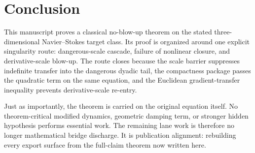 \section{Conclusion}

This manuscript proves a classical no-blow-up theorem on the stated three-dimensional Navier--Stokes target class. Its proof is organized around one explicit singularity route: dangerous-scale cascade, failure of nonlinear closure, and derivative-scale blow-up. The route closes because the scale barrier suppresses indefinite transfer into the dangerous dyadic tail, the compactness package passes the quadratic term on the same equation, and the Euclidean gradient-transfer inequality prevents derivative-scale re-entry.

Just as importantly, the theorem is carried on the original equation itself. No theorem-critical modified dynamics, geometric damping term, or stronger hidden hypothesis performs essential work. The remaining lane work is therefore no longer mathematical bridge discharge. It is publication alignment: rebuilding every export surface from the full-claim theorem now written here.
